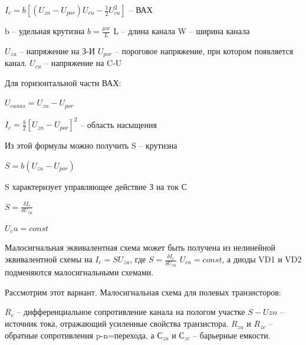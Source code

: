 \documentclass[12pt,a4paper]{article}
\begin{document}
$I_c=b[(U_{zn} - U_{por})U_{cu}-\frac12 U_{cu}^2]$ – ВАХ


b – удельная крутизна
$b = \frac{\mu w}{L}$
L – длина канала
W – ширина канала

$U_{zu}$ – напряжение на З-И
$U_{por}$ – пороговое напряжение, при котором появляется канал.
$U_{cu}$ – напряжение на C-U

Для горизонтальной части ВАХ:

$U_{cunas}=U_{zn} - U_{por}$

$I_c=\frac{b}{2}[U_{zn} - U_{por}]^{2}$ – область насыщения

Из этой формулы можно получить S – крутизна

$S = b(U_{zu} - U_{por})$

S характеризует управляющее действие З на ток С

$S= \frac{\delta I_c}{\delta U_{zu}}$

$U_cu=const$

Малосигнальная эквивалентная схема может быть получена из нелинейной эквивалентной схемы на $I_c=SU_{zu}$, где $S= \frac{\delta I_c}{\delta U_{zu}}$   $U_{cu}=const$, а диоды VD1 и VD2 подменяются малосигнальными схемами.

Рассмотрим этот вариант.
Малосигнальная схема для полевых транзисторов:
\begin{center}
\begin{figure}[h!]
		\label{}
	\end{figure}
\end{center}
$R_c$ – дифференциальное сопротивление канала на пологом участке
$S - U{zn}$ – источник тока, отражающий усиленные свойства транзистора.
$R_{zu}$ и $R_{zc}$ – обратные сопротивления p-n=перехода, а $С_{zu}$ и $С_{zc}$ – барьерные емкости.
\end{document}
